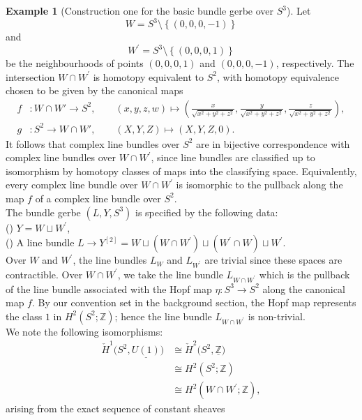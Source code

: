 \documentclass{article}
\theoremstyle{plain}
\theoremstyle{definition}
\newtheorem{exa}[thm]{Example}
\newcommand{\rNum}[1]{\lowercase\expandafter{\romannumeral #1\relax}}
\begin{document}
\begin{exa}[Construction one for the basic bundle gerbe over $S^3$]\cite[Example 12.8 on page 244]{MR2681698}\label{murbun}
Let $$W = S^3 \setminus \left\{(0,0,0,-1)\right\}$$ and $$W^\prime = S^3 \setminus \left\{(0,0,0,1)\right\}$$ be the neighbourhoods of points $(0,0,0,1)$ and $(0,0,0,-1)$, respectively. The intersection $W \cap W^\prime$ is homotopy equivalent to $S^2$, with homotopy equivalence chosen to be given by the canonical maps
\begin{align*}
f &: W \cap W' \longrightarrow S^2, \qquad
(x,y,z,w) \longmapsto
\left(
\frac{x}{\sqrt{x^2+y^2+z^2}},
\frac{y}{\sqrt{x^2+y^2+z^2}},
\frac{z}{\sqrt{x^2+y^2+z^2}}
\right), \\
g &: S^2 \longrightarrow W \cap W', \qquad
(X,Y,Z) \longmapsto (X,Y,Z,0).
\end{align*}
It follows that complex line bundles over $S^2$ are in bijective correspondence with complex line bundles over $W \cap W^\prime$, since line bundles are classified up to isomorphism by homotopy classes of maps into the classifying space. Equivalently, every complex line bundle over $W \cap W^\prime$ is isomorphic to the pullback along the map $f$ of a complex line bundle over $S^2$. \\
The bundle gerbe $(L,Y,S^3)$ is specified by the following data: \\
(\rNum{1}) $Y = W \sqcup W^\prime$, \\
(\rNum{2}) A line bundle $L \longrightarrow Y^{[2]} = W \sqcup (W \cap W^\prime) \sqcup (W^\prime \cap W) \sqcup W^\prime$. \\
Over $W$ and $W^\prime$, the line bundles $L_{W}$ and $L_{W^\prime}$ are trivial since these spaces are contractible. Over $W \cap W^\prime$, we take the line bundle $L_{W \cap W^\prime}$ which is the pullback of the line bundle associated with the Hopf map $\eta:S^3 \longrightarrow S^2$ along the canonical map $f$. By our convention set in the background section, the Hopf map represents the class $1$ in $H^2(S^2;\mathbb{Z})$; hence the line bundle $L_{W \cap W^\prime}$ is non-trivial. \\
We note the following isomorphisms:
\begin{align*}
\check{H}^1\bigl(S^2,\underline{U(1)}\bigr) & \cong \check{H}^2\bigl(S^2,\underline{\mathbb{Z}}\bigr) \\
& \cong H^2(S^2;\mathbb{Z}) \\
& \cong H^2(W \cap W^\prime;\mathbb{Z}),
\end{align*}
arising from the exact sequence of constant sheaves

\end{exa}
\end{document}
